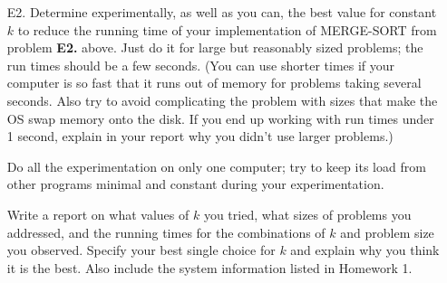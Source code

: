 \documentclass{article}
\begin{document}
\begin{itemize}
\item[E2.]  Determine experimentally, as well as you can, 
the best value for constant $k$ to reduce the running time 
of your implementation of MERGE-SORT from problem \textbf{E2.} above.
Just do it for large but reasonably sized problems; the run times
should be a few seconds.  (You can use shorter times if your computer
is so fast that it runs out of memory for problems taking several seconds.
Also try to avoid complicating the problem with sizes that make the OS
swap memory onto the disk.  If you end up working with run times under
1 second, explain in your report why you didn't use larger problems.)

Do all the experimentation on only one computer; try to keep its
load from other programs minimal and constant during your experimentation. 

Write a report on what values of $k$ you tried, what sizes of 
problems you addressed,
and the running times for the combinations of $k$ and problem size you 
observed.  Specify your best single choice for $k$ and explain why
you think it is the best.
Also include the system information listed in 
Homework 1.

\end{itemize}
\end{document}

